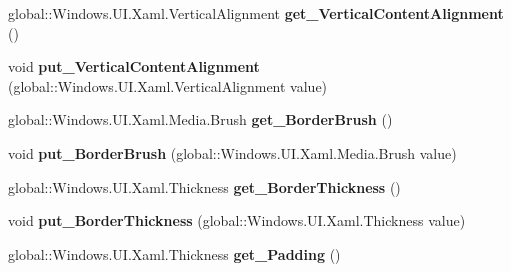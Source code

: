 \begin{DoxyCompactItemize}
global\+::\+Windows.\+U\+I.\+Xaml.\+Vertical\+Alignment {\bfseries get\+\_\+\+Vertical\+Content\+Alignment} ()
\item 
\mbox{\label{interface_windows_1_1_u_i_1_1_xaml_1_1_controls_1_1_i_content_presenter4_adb058d58f1fe8cb9afcc0b94b026986c}} 
void {\bfseries put\+\_\+\+Vertical\+Content\+Alignment} (global\+::\+Windows.\+U\+I.\+Xaml.\+Vertical\+Alignment value)
\item 
\mbox{\label{interface_windows_1_1_u_i_1_1_xaml_1_1_controls_1_1_i_content_presenter4_ac7fd7fd864af0f81ad392923c67a8104}} 
global\+::\+Windows.\+U\+I.\+Xaml.\+Media.\+Brush {\bfseries get\+\_\+\+Border\+Brush} ()
\item 
\mbox{\label{interface_windows_1_1_u_i_1_1_xaml_1_1_controls_1_1_i_content_presenter4_a4bf1431ff8dce2bcdba162ef10e0f159}} 
void {\bfseries put\+\_\+\+Border\+Brush} (global\+::\+Windows.\+U\+I.\+Xaml.\+Media.\+Brush value)
\item 
\mbox{\label{interface_windows_1_1_u_i_1_1_xaml_1_1_controls_1_1_i_content_presenter4_aa8efa0fe881e1eb0b40490af2afb9d22}} 
global\+::\+Windows.\+U\+I.\+Xaml.\+Thickness {\bfseries get\+\_\+\+Border\+Thickness} ()
\item 
\mbox{\label{interface_windows_1_1_u_i_1_1_xaml_1_1_controls_1_1_i_content_presenter4_a29676ddecb0d27cd5443b81c5a6b1a68}} 
void {\bfseries put\+\_\+\+Border\+Thickness} (global\+::\+Windows.\+U\+I.\+Xaml.\+Thickness value)
\item 
\mbox{\label{interface_windows_1_1_u_i_1_1_xaml_1_1_controls_1_1_i_content_presenter4_a7e1575cbfaeb5ad47ddbf4528c2a01fe}} 
global\+::\+Windows.\+U\+I.\+Xaml.\+Thickness {\bfseries get\+\_\+\+Padding} ()
\item 
\mbox{\label{interface_windows_1_1_u_i_1_1_xaml_1_1_controls_1_1_i_content_presenter4_af18a60ec485bc0df6feb66d44efadbb0}} 

\end{DoxyCompactItemize}
